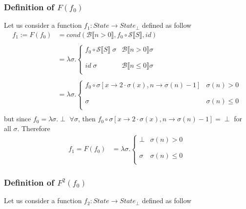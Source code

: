 \documentclass{article}
\newcommand{\bcal}{\mathcal{B}}
\newcommand{\scal}{\mathcal{S}}
\newcommand{\bool}[1]{\bcal \llbracket #1 \rrbracket}
\newcommand{\sem}[1]{\scal \llbracket #1 \rrbracket}
\begin{document}
\subsubsection*{Definition of $F(f_0)$}
Let us consider a function $f_1: State \longrightarrow State_{\perp}$ defined as follow
\begin{align*}
f_1 := F(f_0) &= cond(\bool{n > 0}, f_0 \circ \sem{S},id) \\ \\
& = \lambda \sigma . \left\{
\begin{array}{ll}
      f_0 \circ \sem{S} \; \sigma & \bool{n>0} \sigma\\
      \\ \\
      id \; \sigma & \bool{n \leq 0} \sigma \\
\end{array} 
\right. \\ \\
& = \lambda \sigma . \left\{
\begin{array}{ll}
      f_0 \circ \sigma[x\rightarrow 2 \cdot \sigma(x), n \rightarrow \sigma(n)-1] & \sigma(n) > 0 \\
      \\ \\
      \sigma & \sigma(n) \leq 0 \\
\end{array} 
\right.\\
\end{align*}
but since $f_0 = \lambda \sigma . \perp$ $\forall \sigma$, then $ f_0 \circ \sigma[x\rightarrow 2 \cdot \sigma(x), n \rightarrow \sigma(n)-1] = \perp$ for all $\sigma$. Therefore \\
\begin{align}
f_1 = F(f_0) &= \lambda \sigma . \left\{
\begin{array}{ll}
      \perp & \sigma(n) > 0 \\
      \\ \\
      \sigma & \sigma(n) \leq 0 \\
\end{array} 
\right.
\end{align}
\subsubsection*{Definition of $F^2(f_0)$}
Let us consider a function $f_2: State \longrightarrow State_{\perp}$ defined as follow
\end{document}
